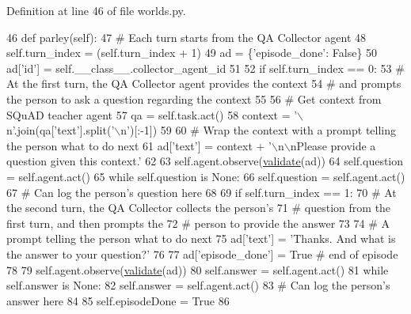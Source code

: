 Definition at line 46 of file worlds.\+py.


\begin{DoxyCode}
46     \textcolor{keyword}{def }parley(self):
47         \textcolor{comment}{# Each turn starts from the QA Collector agent}
48         self.turn\_index = (self.turn\_index + 1) %
49         ad = \{\textcolor{stringliteral}{'episode\_done'}: \textcolor{keyword}{False}\}
50         ad[\textcolor{stringliteral}{'id'}] = self.\_\_class\_\_.collector\_agent\_id
51 
52         \textcolor{keywordflow}{if} self.turn\_index == 0:
53             \textcolor{comment}{# At the first turn, the QA Collector agent provides the context}
54             \textcolor{comment}{# and prompts the person to ask a question regarding the context}
55 
56             \textcolor{comment}{# Get context from SQuAD teacher agent}
57             qa = self.task.act()
58             context = \textcolor{stringliteral}{'\(\backslash\)n'}.join(qa[\textcolor{stringliteral}{'text'}].split(\textcolor{stringliteral}{'\(\backslash\)n'})[:-1])
59 
60             \textcolor{comment}{# Wrap the context with a prompt telling the person what to do next}
61             ad[\textcolor{stringliteral}{'text'}] = context + \textcolor{stringliteral}{'\(\backslash\)n\(\backslash\)nPlease provide a question given this context.'}
62 
63             self.agent.observe(\hyperlink{namespaceparlai_1_1core_1_1worlds_afc3fad603b7bce41dbdc9cdc04a9c794}{validate}(ad))
64             self.question = self.agent.act()
65             \textcolor{keywordflow}{while} self.question \textcolor{keywordflow}{is} \textcolor{keywordtype}{None}:
66                 self.question = self.agent.act()
67             \textcolor{comment}{# Can log the person's question here}
68 
69         \textcolor{keywordflow}{if} self.turn\_index == 1:
70             \textcolor{comment}{# At the second turn, the QA Collector collects the person's}
71             \textcolor{comment}{# question from the first turn, and then prompts the}
72             \textcolor{comment}{# person to provide the answer}
73 
74             \textcolor{comment}{# A prompt telling the person what to do next}
75             ad[\textcolor{stringliteral}{'text'}] = \textcolor{stringliteral}{'Thanks. And what is the answer to your question?'}
76 
77             ad[\textcolor{stringliteral}{'episode\_done'}] = \textcolor{keyword}{True}  \textcolor{comment}{# end of episode}
78 
79             self.agent.observe(\hyperlink{namespaceparlai_1_1core_1_1worlds_afc3fad603b7bce41dbdc9cdc04a9c794}{validate}(ad))
80             self.answer = self.agent.act()
81             \textcolor{keywordflow}{while} self.answer \textcolor{keywordflow}{is} \textcolor{keywordtype}{None}:
82                 self.answer = self.agent.act()
83             \textcolor{comment}{# Can log the person's answer here}
84 
85             self.episodeDone = \textcolor{keyword}{True}
86 
\end{DoxyCode}
